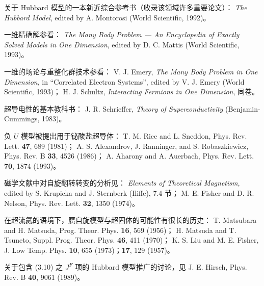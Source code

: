 \begin{chapbib}
\item 关于 Hubbard 模型的一本新近综合参考书（收录该领域许多重要论文）：
  \textit{The Hubbard Model}, edited by A. Montorosi (World Scientific, 1992)。
\item 一维精确解参看：
  \textit{The Many Body Problem --- An Encyclopedia of Exactly Solved Models in One Dimension}, edited by D. C. Mattis (World Scientific, 1993)。
\item 一维的场论与重整化群技术参看：
  V. J. Emery, \textit{The Many Body Problem in One Dimension}, in ``Correlated Electron Systems'', edited by V. J. Emery (World Scientific, 1993)；
  H. J. Schultz, \textit{Interacting Fermions in One Dimension}, 同卷。
\item 超导电性的基本教科书：
  J. R. Schrieffer, \textit{Theory of Superconductivity} (Benjamin-Cummings, 1983)。
\item 负 $U$ 模型被提出用于铋酸盐超导体：
  T. M. Rice and L. Sneddon, Phys. Rev. Lett. \textbf{47}, 689 (1981)；
  A. S. Alexandrov, J. Ranninger, and S. Robaszkiewicz, Phys. Rev. B \textbf{33}, 4526 (1986)；
  A. Aharony and A. Auerbach, Phys. Rev. Lett. \textbf{70}, 1874 (1993)。
\item 磁学文献中对自旋翻转转变的分析见：
  \textit{Elements of Theoretical Magnetism}, edited by S. Krupicka and J. Sternberk (Iliffe), 7.4 节；
  M. E. Fisher and D. R. Nelson, Phys. Rev. Lett. \textbf{32}, 1350 (1974)。
\item 在超流氦的语境下，赝自旋模型与超固体的可能性有很长的历史：
  T. Matsubara and H. Matsuda, Prog. Theor. Phys. \textbf{16}, 569 (1956)；
  H. Matsuda and T. Tsuneto, Suppl. Prog. Theor. Phys. \textbf{46}, 411 (1970)；
  K. S. Liu and M. E. Fisher, J. Low Temp. Phys. \textbf{10}, 655 (1973)；\textbf{17}, 129 (1957)。
\item 关于包含 (3.10) 之 $J^F$ 项的 Hubbard 模型推广的讨论，见
  J. E. Hirsch, Phys. Rev. B \textbf{40}, 9061 (1989)。
\end{chapbib}
